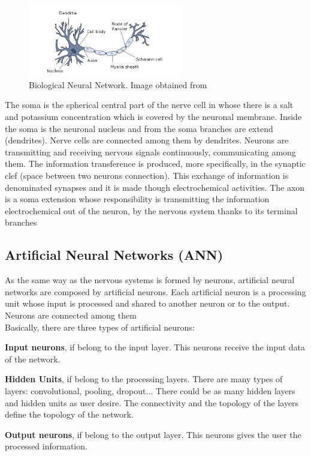 \begin{figure}[htb]
\centering
\includegraphics[width=0.6\textwidth]{images_miscelaneus/neuron.png}
\caption{Biological Neural Network. Image obtained from \cite{BINN}} \label{fig:Bio-Neuron}
\end{figure}

The soma is the spherical central part of the nerve cell in whose there is a salt and potassium concentration which is covered by the neuronal membrane. Inside the soma is the neuronal nucleus and from the soma branches are extend (dendrites). Nerve cells are connected among them by dendrites. Neurons are transmitting and receiving nervous signals continuously, communicating among them. The information transference is produced, more specifically, in the synaptic clef (space between two neurons connection). This exchange of information is denominated synapses and it is made though electrochemical activities. The axon is a soma extension whose responsibility is transmitting the information electrochemical out of the neuron, by the nervous system thanks to its terminal branches \cite{BINN, neuroscience}\\

\subsection{Artificial Neural Networks (ANN)}
As the same way as the nervous systems is formed by neurons, artificial neural networks are composed by artificial neurons. Each artificial neuron is a processing unit whose input is processed and shared to another neuron or to the output. Neurons are connected among them \cite{BINN}\\

Basically, there are three types of artificial neurons:
\begin{description}[noitemsep,topsep=8pt,parsep=0pt,partopsep=20pt]
\item \textbf{Input neurons}, if belong to the input layer. This neurons receive the input data of the network.\\
\item \textbf{Hidden Units}, if belong to the processing layers. There are many types of layers: convolutional, pooling, dropout... There could be as many hidden layers and hidden units as user desire. The connectivity and the topology of the layers define the topology of the network. \\
\item \textbf{Output neurons}, if belong to the output layer. This neurons gives the user the processed information.\\
\end{description}

